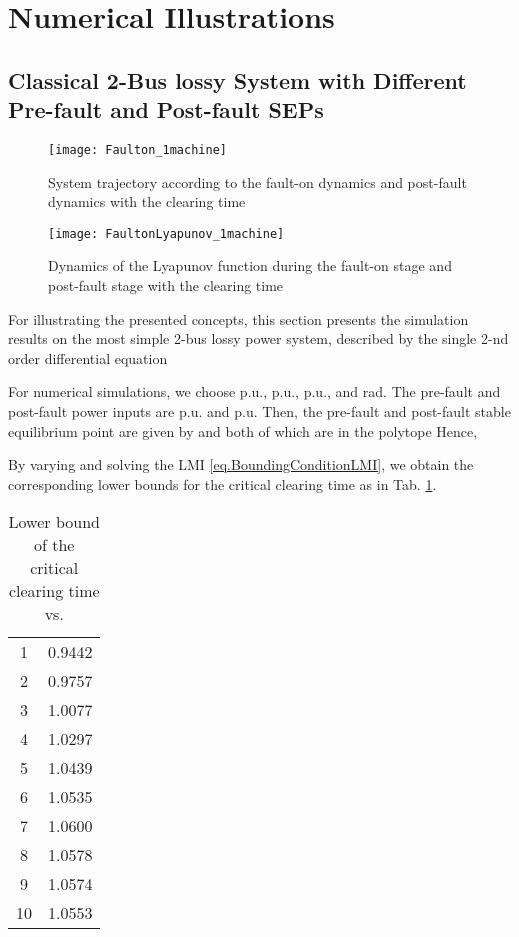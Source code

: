 \documentclass[final]{IEEEtran}
\begin{document}
\section{Numerical Illustrations}
\label{sec:simulations}

\subsection{Classical 2-Bus lossy System with Different Pre-fault and Post-fault SEPs}
\begin{figure}[t!]
\centering
\texttt{[image: Faulton\_1machine]}
\caption{System trajectory according to the fault-on dynamics and
post-fault dynamics with the clearing time } \label{fig.Trajectory}
\end{figure}

\begin{figure}[t!]
\centering
\texttt{[image: FaultonLyapunov\_1machine]}
\caption{Dynamics of the Lyapunov function during the fault-on
stage and post-fault stage with the clearing time } \label{fig.Lyapunov}
\end{figure}

For illustrating the presented concepts, this section presents the
simulation results on the most simple 2-bus lossy power system,
described by the single 2-nd order differential equation

For numerical simulations, we choose  p.u.,  p.u.,
 p.u., and  rad. The pre-fault and post-fault
power inputs are  p.u. and  p.u.
Then, the pre-fault and post-fault stable equilibrium point are
given by  and
 both of which are
in the polytope  Hence,

By varying  and solving the LMI
\eqref{eq.BoundingConditionLMI}, we obtain the corresponding lower
bounds for the critical clearing time as in Tab. \ref{tab.CCT}.

\begin{table}[ht!]
\centering
\begin{tabular}{|c|c|}
  \hline
 &  \\
  \hline
  1 &  0.9442 \\
  2 & 0.9757 \\
  3 & 1.0077 \\
  4 & 1.0297 \\
  5 & 1.0439\\
  6 &  1.0535\\
  7 & 1.0600 \\
  8 &  1.0578 \\
  9 & 1.0574\\
 10 & 1.0553\\
  \hline
\end{tabular}
\caption{Lower bound of the critical clearing time vs.
}\label{tab.CCT}
\end{table}
\end{document}
